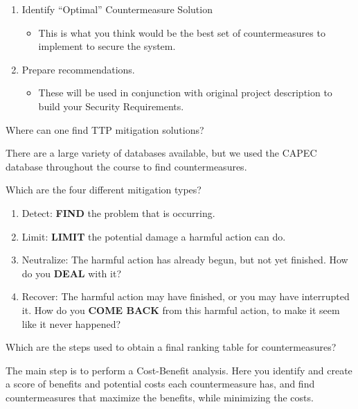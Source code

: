 \begin{questions}
\begin{solution}
\begin{enumerate}[noitemsep]
\begin{itemize}[noitemsep]
      \end{itemize}
    \item Identify ``Optimal'' Countermeasure Solution
      \begin{itemize}[noitemsep]
      \item This is what you think would be the best set of countermeasures to implement to secure the system.
      \end{itemize}
    \item Prepare recommendations.
      \begin{itemize}[noitemsep]
      \item These will be used in conjunction with original project description to build your Security Requirements.
      \end{itemize}
    \end{enumerate}
  \end{solution}

\question{} Where can one find TTP mitigation solutions?
  \begin{solution}
    There are a large variety of databases available, but we used the CAPEC database throughout the course to find countermeasures.
  \end{solution}

\question{} Which are the four different mitigation types?
  \begin{solution}
    \begin{enumerate}[noitemsep]
    \item Detect: \textbf{FIND} the problem that is occurring.
    \item Limit: \textbf{LIMIT} the potential damage a harmful action can do.
    \item Neutralize: The harmful action has already begun, but not yet finished.
      How do you \textbf{DEAL} with it?
    \item Recover: The harmful action may have finished, or you may have interrupted it.
      How do you \textbf{COME BACK} from this harmful action, to make it seem like it never happened?
    \end{enumerate}
  \end{solution}

\question{} Which are the steps used to obtain a final ranking table for countermeasures?
  \begin{solution}
    The main step is to perform a Cost-Benefit analysis.
    Here you identify and create a score of benefits and potential costs each countermeasure has, and find countermeasures that maximize the benefits, while minimizing the costs.
  \end{solution}


\end{questions}
